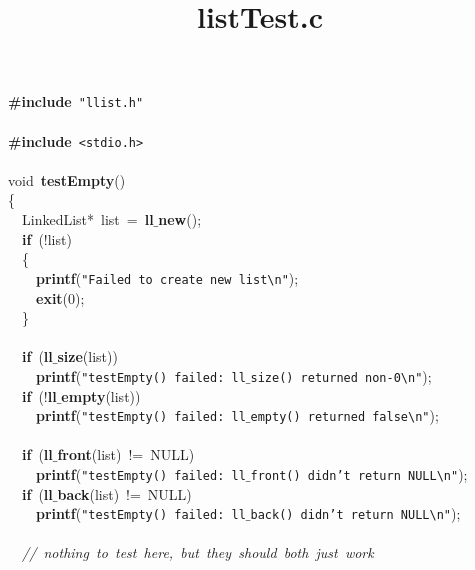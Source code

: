 \documentclass{article}
\title{listTest.c}
\date{}
\begin{document}
\maketitle

\noindent
\mbox{}\textbf{\#include}\ \texttt{"{}llist.h"{}} \\
\mbox{} \\
\mbox{}\textbf{\#include}\ \texttt{\textless{}stdio.h\textgreater{}} \\
\mbox{} \\
\mbox{}void\ \textbf{testEmpty}() \\
\mbox{}\{ \\
\mbox{}\ \ LinkedList*\ list\ =\ \textbf{ll$\_$new}(); \\
\mbox{}\ \ \textbf{if}\ (!list) \\
\mbox{}\ \ \{ \\
\mbox{}\ \ \ \ \textbf{printf}(\texttt{"{}Failed\ to\ create\ new\ list}\texttt{\textbackslash{}n}\texttt{"{}}); \\
\mbox{}\ \ \ \ \textbf{exit}(0); \\
\mbox{}\ \ \} \\
\mbox{} \\
\mbox{}\ \ \textbf{if}\ (\textbf{ll$\_$size}(list)) \\
\mbox{}\ \ \ \ \textbf{printf}(\texttt{"{}testEmpty()\ failed:\ ll$\_$size()\ returned\ non-0}\texttt{\textbackslash{}n}\texttt{"{}}); \\
\mbox{}\ \ \textbf{if}\ (!\textbf{ll$\_$empty}(list)) \\
\mbox{}\ \ \ \ \textbf{printf}(\texttt{"{}testEmpty()\ failed:\ ll$\_$empty()\ returned\ false}\texttt{\textbackslash{}n}\texttt{"{}}); \\
\mbox{} \\
\mbox{}\ \ \textbf{if}\ (\textbf{ll$\_$front}(list)\ !=\ NULL) \\
\mbox{}\ \ \ \ \textbf{printf}(\texttt{"{}testEmpty()\ failed:\ ll$\_$front()\ didn't\ return\ NULL}\texttt{\textbackslash{}n}\texttt{"{}}); \\
\mbox{}\ \ \textbf{if}\ (\textbf{ll$\_$back}(list)\ !=\ NULL) \\
\mbox{}\ \ \ \ \textbf{printf}(\texttt{"{}testEmpty()\ failed:\ ll$\_$back()\ didn't\ return\ NULL}\texttt{\textbackslash{}n}\texttt{"{}}); \\
\mbox{} \\
\mbox{}\ \ \textit{//\ nothing\ to\ test\ here,\ but\ they\ should\ both\ just\ work} \\
\end{document}
